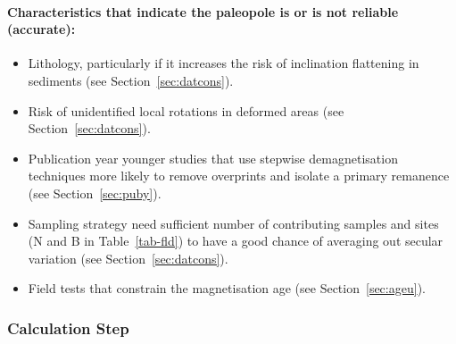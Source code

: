 \paragraph{Characteristics that indicate the paleopole is or is not reliable
(accurate):}
\begin{itemize}
  \item Lithology, particularly if it increases the risk of inclination
    flattening in sediments (see Section~\ref{sec:datcons}).
  \item Risk of unidentified local rotations in deformed areas (see
    Section~\ref{sec:datcons}).
  \item Publication year \textemdash{} younger studies that use stepwise
    demagnetisation techniques more likely to remove overprints and isolate a
    primary remanence (see Section~\ref{sec:puby}).
  \item Sampling strategy \textemdash{} need sufficient number of contributing
    samples and sites (N and B in Table~\ref{tab-fld}) to have a good chance of
    averaging out secular variation (see Section~\ref{sec:datcons}).
  \item Field tests that constrain the magnetisation age (see
    Section~\ref{sec:ageu}).
\end{itemize}

\subsubsection{Calculation Step}


